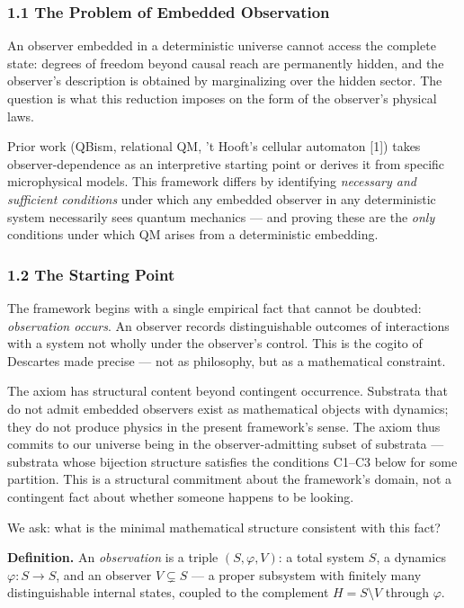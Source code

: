 \documentclass[
]{article}
\begin{document}
\hypertarget{the-problem-of-embedded-observation}{%
\subsubsection{1.1 The Problem of Embedded
Observation}\label{the-problem-of-embedded-observation}}

An observer embedded in a deterministic universe cannot access the
complete state: degrees of freedom beyond causal reach are permanently
hidden, and the observer's description is obtained by marginalizing over
the hidden sector. The question is what this reduction imposes on the
form of the observer's physical laws.

Prior work (QBism, relational QM, 't Hooft's cellular automaton {[}1{]})
takes observer-dependence as an interpretive starting point or derives
it from specific microphysical models. This framework differs by
identifying \emph{necessary and sufficient conditions} under which any
embedded observer in any deterministic system necessarily sees quantum
mechanics --- and proving these are the \emph{only} conditions under
which QM arises from a deterministic embedding.

\hypertarget{the-starting-point}{%
\subsubsection{1.2 The Starting Point}\label{the-starting-point}}

The framework begins with a single empirical fact that cannot be
doubted: \emph{observation occurs}. An observer records distinguishable
outcomes of interactions with a system not wholly under the observer's
control. This is the cogito of Descartes made precise --- not as
philosophy, but as a mathematical constraint.

The axiom has structural content beyond contingent occurrence. Substrata
that do not admit embedded observers exist as mathematical objects with
dynamics; they do not produce physics in the present framework's sense.
The axiom thus commits to our universe being in the observer-admitting
subset of substrata --- substrata whose bijection structure satisfies
the conditions C1--C3 below for some partition. This is a structural
commitment about the framework's domain, not a contingent fact about
whether someone happens to be looking.

We ask: what is the minimal mathematical structure consistent with this
fact?

\textbf{Definition.} An \emph{observation} is a triple
\((S, \varphi, V)\): a total system \(S\), a dynamics
\(\varphi: S \to S\), and an observer \(V \subsetneq S\) --- a proper
subsystem with finitely many distinguishable internal states, coupled to
the complement \(H = S \setminus V\) through \(\varphi\).
\end{document}
